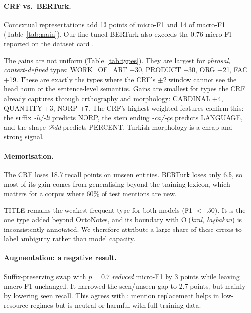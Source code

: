 \documentclass[11pt]{article}
\begin{document}
\paragraph{CRF vs.\ BERTurk.} Contextual representations add 13 points of micro-F1 and 14 of macro-F1 (Table~\ref{tab:main}). Our fine-tuned BERTurk also exceeds the 0.76 micro-F1 reported on the dataset card \citep{altinok2023turkish}.

The gains are not uniform (Table~\ref{tab:types}). They are largest for \emph{phrasal, context-defined} types: WORK\_OF\_ART +30, PRODUCT +30, ORG +21, FAC +19. These are exactly the types where the CRF's $\pm$2 window cannot see the head noun or the sentence-level semantics. Gains are smallest for types the CRF already captures through orthography and morphology: CARDINAL +4, QUANTITY +3, NORP +7. The CRF's highest-weighted features confirm this: the suffix \textit{-lı/-li} predicts NORP, the stem ending \textit{-ca/-çe} predicts LANGUAGE, and the shape \textit{\%dd} predicts PERCENT. Turkish morphology is a cheap and strong signal.

\paragraph{Memorisation.} The CRF loses 18.7 recall points on unseen entities. BERTurk loses only 6.5, so most of its gain comes from generalising beyond the training lexicon, which matters for a corpus where 60\% of test mentions are new.

TITLE remains the weakest frequent type for both models (F1 $<$ .50). It is the one type added beyond OntoNotes, and its boundary with O (\textit{kral}, \textit{başbakan}) is inconsistently annotated. We therefore attribute a large share of these errors to label ambiguity rather than model capacity.

\paragraph{Augmentation: a negative result.} Suffix-preserving swap with $p{=}0.7$ \emph{reduced} micro-F1 by 3 points while leaving macro-F1 unchanged. It narrowed the seen/unseen gap to 2.7 points, but mainly by lowering seen recall. This agrees with \citet{dai2020analysis}: mention replacement helps in low-resource regimes but is neutral or harmful with full training data.
\end{document}
